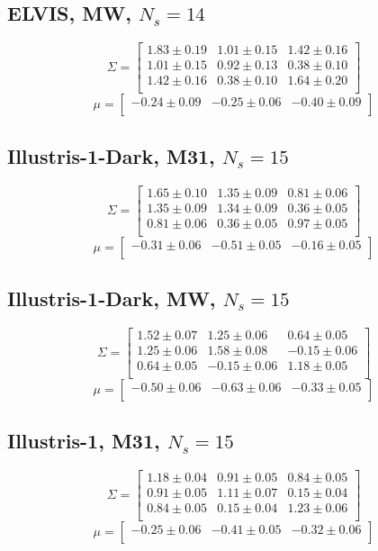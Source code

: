 \documentclass[a4paper,fleqn,usenatbib]{mnras}
\begin{document}
\subsection{ELVIS, MW, $N_s=14$}
\[
\Sigma=
\begin{bmatrix}
1.83 \pm 0.19 & 1.01 \pm 0.15 & 1.42 \pm 0.16\\
1.01 \pm 0.15 & 0.92 \pm 0.13 & 0.38 \pm 0.10\\
1.42 \pm 0.16 & 0.38 \pm 0.10 & 1.64 \pm 0.20\\
\end{bmatrix}
\]
\[
\mu=
\begin{bmatrix}
-0.24 \pm 0.09 & -0.25 \pm 0.06 & -0.40 \pm 0.09\\
\end{bmatrix}
\]

\subsection{Illustris-1-Dark, M31, $N_s=15$}
\[
\Sigma=
\begin{bmatrix}
1.65 \pm 0.10 & 1.35 \pm 0.09 & 0.81 \pm 0.06\\
1.35 \pm 0.09 & 1.34 \pm 0.09 & 0.36 \pm 0.05\\
0.81 \pm 0.06 & 0.36 \pm 0.05 & 0.97 \pm 0.05\\
\end{bmatrix}
\]
\[
\mu=
\begin{bmatrix}
-0.31 \pm 0.06 & -0.51 \pm 0.05 & -0.16 \pm 0.05\\
\end{bmatrix}
\]
\subsection{Illustris-1-Dark, MW, $N_s=15$}
\[
\Sigma=
\begin{bmatrix}
1.52 \pm 0.07 & 1.25 \pm 0.06 & 0.64 \pm 0.05\\
1.25 \pm 0.06 & 1.58 \pm 0.08 & -0.15 \pm 0.06\\
0.64 \pm 0.05 & -0.15 \pm 0.06 & 1.18 \pm 0.05\\
\end{bmatrix}
\]
\[
\mu=
\begin{bmatrix}
-0.50 \pm 0.06 & -0.63 \pm 0.06 & -0.33 \pm 0.05\\
\end{bmatrix}
\]

\subsection{Illustris-1, M31, $N_s=15$}
\[
\Sigma=
\begin{bmatrix}
1.18 \pm 0.04 & 0.91 \pm 0.05 & 0.84 \pm 0.05\\
0.91 \pm 0.05 & 1.11 \pm 0.07 & 0.15 \pm 0.04\\
0.84 \pm 0.05 & 0.15 \pm 0.04 & 1.23 \pm 0.06\\
\end{bmatrix}
\]
\[
\mu=
\begin{bmatrix}
-0.25 \pm 0.06 & -0.41 \pm 0.05 & -0.32 \pm 0.06\\
\end{bmatrix}
\]
\end{document}
